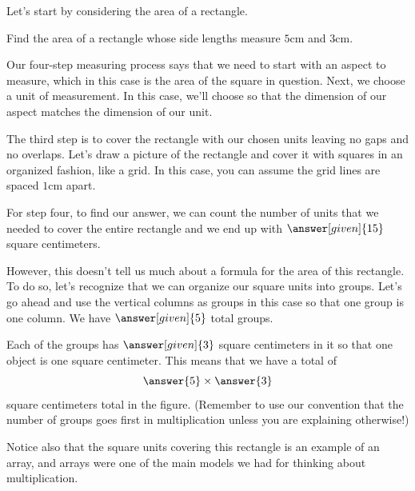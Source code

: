 \documentclass{ximera}
\begin{document}
Let's start by considering the area of a rectangle.
\begin{example}
Find the area of a rectangle whose side lengths measure $5$cm and $3$cm.

Our four-step measuring process says that we need to start with an aspect to measure, which in this case is the area of the square in question. Next, we choose a unit of measurement. In this case, we'll choose  so that the dimension of our aspect matches the dimension of our unit.

The third step is to cover the rectangle with our chosen units leaving no gaps and no overlaps. Let's draw a picture of the rectangle and cover it with squares in an organized fashion, like a grid. In this case, you can assume the grid lines are spaced $1$cm apart.
\begin{image}\end{image}

For step four, to find our answer, we can count the number of units that we needed to cover the entire rectangle and we end up with $\answer[given]{15}$ square centimeters.

However, this doesn't tell us much about a formula for the area of this rectangle. To do so, let's recognize that we can organize our square units into groups. Let's go ahead and use the vertical columns as groups in this case so that one group is one column. We have $\answer[given]{5}$ total groups.
\begin{image}\end{image}

Each of the groups has $\answer[given]{3}$ square centimeters in it so that one object is one square centimeter. This means that we have a total of 
\[
\answer{5} \times \answer{3}
\]
square centimeters total in the figure. (Remember to use our convention that the number of groups goes first in multiplication unless you are explaining otherwise!)

Notice also that the square units covering this rectangle is an example of an array, and arrays were one of the main models we had for thinking about multiplication.

\end{example}
\end{document}
